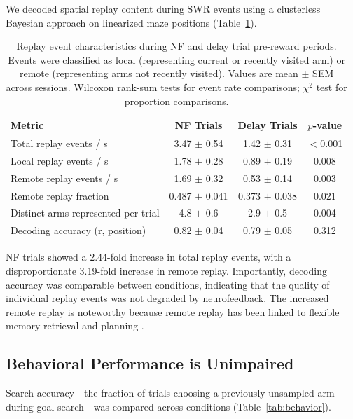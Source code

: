 \documentclass[11pt]{article}
\begin{document}
We decoded spatial replay content during SWR events using a clusterless Bayesian approach \citep{denovellis2021} on linearized maze positions (Table~\ref{tab:replay}).

\begin{table}[H]
\centering
\caption{Replay event characteristics during NF and delay trial pre-reward periods. Events were classified as local (representing current or recently visited arm) or remote (representing arms not recently visited). Values are mean $\pm$ SEM across sessions. Wilcoxon rank-sum tests for event rate comparisons; $\chi^2$ test for proportion comparisons.}
\label{tab:replay}
\begin{tabular}{lccc}
\toprule
\textbf{Metric} & \textbf{NF Trials} & \textbf{Delay Trials} & \textbf{$p$-value} \\
\midrule
Total replay events / s & 3.47 $\pm$ 0.54 & 1.42 $\pm$ 0.31 & $<$0.001 \\
Local replay events / s & 1.78 $\pm$ 0.28 & 0.89 $\pm$ 0.19 & 0.008 \\
Remote replay events / s & 1.69 $\pm$ 0.32 & 0.53 $\pm$ 0.14 & 0.003 \\
Remote replay fraction & 0.487 $\pm$ 0.041 & 0.373 $\pm$ 0.038 & 0.021 \\
Distinct arms represented per trial & 4.8 $\pm$ 0.6 & 2.9 $\pm$ 0.5 & 0.004 \\
Decoding accuracy (r, position) & 0.82 $\pm$ 0.04 & 0.79 $\pm$ 0.05 & 0.312 \\
\bottomrule
\end{tabular}
\end{table}

NF trials showed a 2.44-fold increase in total replay events, with a disproportionate 3.19-fold increase in remote replay. Importantly, decoding accuracy was comparable between conditions, indicating that the quality of individual replay events was not degraded by neurofeedback. The increased remote replay is noteworthy because remote replay has been linked to flexible memory retrieval and planning \citep{pfeiffer2013, olafsdottir2018}.

\subsection{Behavioral Performance is Unimpaired}

Search accuracy---the fraction of trials choosing a previously unsampled arm during goal search---was compared across conditions (Table~\ref{tab:behavior}).
\end{document}
